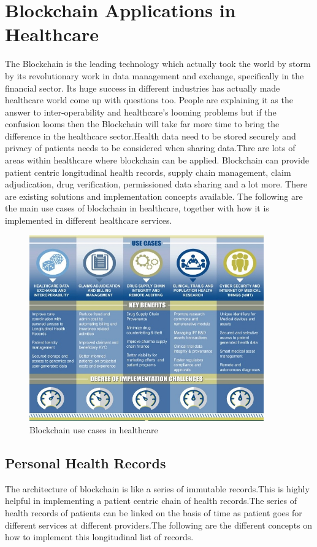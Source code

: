 \documentclass[12pt]{report}
\begin{document}
\chapter{Blockchain Applications in Healthcare}
\par The Blockchain is the leading technology which actually took the world by storm by its revolutionary work in data management and exchange, specifically in the financial sector. Its huge success in different industries has actually made healthcare world come up with questions too. People are explaining it as the answer to inter-operability and healthcare’s looming problems but if the confusion looms then the Blockchain will take far more time to bring the difference in the healthcare sector.Health data  need to be stored securely and privacy of patients needs to be considered when sharing data.Thre are lots of areas within healthcare where blockchain can be applied. Blockchain can provide patient centric longitudinal health records, supply chain management, claim adjudication, drug verification, permissioned data sharing and a lot more. There are existing solutions and implementation concepts available. The following are the main use cases of blockchain in  healthcare, together with how it is implemented in different healthcare services.
\begin{figure}[H]
\centering
\includegraphics[width=0.9\textwidth]{apps.jpg}
\caption{Blockchain use cases in healthcare \cite{13}}
\label{usecase}
\end{figure}
\section{Personal Health Records}
The architecture of blockchain is like a series of immutable records.This is highly helpful in implementing a patient centric chain of health records.The series of health records of patients can be linked on the basis of time as patient goes for different services at different providers.The following are the different concepts on how to implement this longitudinal list of records.
\end{document}
